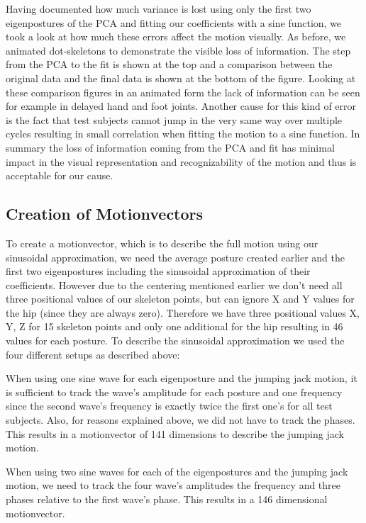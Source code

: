 \documentclass[a4paper]{article}
\begin{document}
Having documented how much variance is lost using only the first two eigenpostures of the PCA and fitting our coefficients with a sine function, we took a look at how much these errors affect the motion visually.
As before, we animated dot-skeletons to demonstrate the visible loss of information.
The step from the PCA to the fit is shown at the top and a comparison between the original data and the final data is shown at the bottom of the figure.
Looking at these comparison figures in an animated form the lack of information can be seen for example in delayed hand and foot joints.
Another cause for this kind of error is the fact that test subjects cannot jump in the very same way over multiple cycles resulting in small correlation when fitting the motion to a sine function.
In summary the loss of information coming from the PCA and fit has minimal impact in the visual representation and recognizability of the motion and thus is acceptable for our cause.


\subsection{Creation of Motionvectors}
To create a motionvector, which is to describe the full motion using our sinusoidal approximation, we need the average posture created earlier and the first two eigenpostures including the sinusoidal approximation of their coefficients.
However due to the centering mentioned earlier we don't need all three positional values of our skeleton points, but can ignore X and Y values for the hip (since they are always zero).
Therefore we have three positional values X, Y, Z for 15 skeleton points and only one additional for the hip resulting in 46 values for each posture.
To describe the sinusoidal approximation we used the four different setups as described above:

When using one sine wave for each eigenposture and the jumping jack motion, it is sufficient to track the wave's amplitude for each posture and one frequency since the second wave's frequency is exactly twice the first one's for all test subjects.
Also, for reasons explained above, we did not have to track the phases.
This results in a motionvector of 141 dimensions to describe the jumping jack motion.

When using two sine waves for each of the eigenpostures and the jumping jack motion, we need to track the four wave's amplitudes the frequency and three phases relative to the first wave's phase.
This results in a 146 dimensional motionvector.
\end{document}

